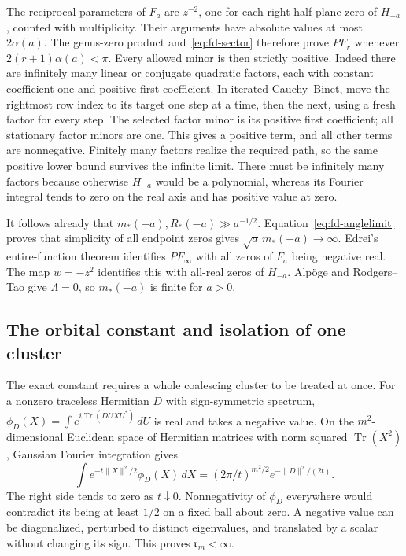 The reciprocal parameters of $F_a$ are $z^{-2}$, one for each
right-half-plane zero of $H_{-a}$, counted with multiplicity.  Their
arguments have absolute values at most $2\alpha(a)$.
The genus-zero product and~\eqref{eq:fd-sector} therefore prove
$PF_r$ whenever $2(r+1)\alpha(a)<\pi$.
Every allowed minor is then strictly positive.  Indeed there are
infinitely many linear or conjugate quadratic factors, each with
constant coefficient one and positive first coefficient.  In iterated
Cauchy--Binet, move the rightmost row index to its target one step at
a time, then the next, using a fresh factor for every step.  The
selected factor minor is its positive first coefficient; all stationary
factor minors are one.  This gives a positive term, and all other terms
are nonnegative.  Finitely many factors realize the required path,
so the same positive lower bound survives the infinite limit.
There must be infinitely many factors because otherwise $H_{-a}$
would be a polynomial, whereas its Fourier integral tends to zero on
the real axis and has positive value at zero.

It follows already that $m_*(-a),R_*(-a)\gg a^{-1/2}$.
Equation~\eqref{eq:fd-anglelimit} proves that simplicity of all endpoint
zeros gives $\sqrt a\,m_*(-a)\to\infty$.
Edrei's entire-function theorem \cite[Proposition A, pp.~86--87;
Section~3, p.~92]{Edrei1953} identifies $PF_\infty$ with all zeros of
$F_a$ being negative real.  The map $w=-z^2$ identifies this with
all-real zeros of $H_{-a}$.  Alp\"oge and Rodgers--Tao give
$\Lambda=0$, so $m_*(-a)$ is finite for $a>0$.

\subsection{The orbital constant and isolation of one cluster}

The exact constant requires a whole coalescing cluster to be treated at once.
For a nonzero traceless Hermitian $D$ with sign-symmetric spectrum,
$\phi_D(X)=\int e^{i\operatorname{Tr}(DUXU^*)}\,dU$ is real and takes
a negative value.  On the $m^2$-dimensional Euclidean space of Hermitian
matrices with norm squared $\operatorname{Tr}(X^2)$, Gaussian Fourier
integration gives
\[
 \int e^{-t\|X\|^2/2}\phi_D(X)\,dX
   =(2\pi/t)^{m^2/2}e^{-\|D\|^2/(2t)}.
\]
The right side tends to zero as $t\downarrow0$.  Nonnegativity of
$\phi_D$ everywhere would contradict its being at least $1/2$ on a
fixed ball about zero.  A negative value can be diagonalized, perturbed
to distinct eigenvalues, and translated by a scalar without changing its sign.
This proves $\mathfrak r_m<\infty$.

